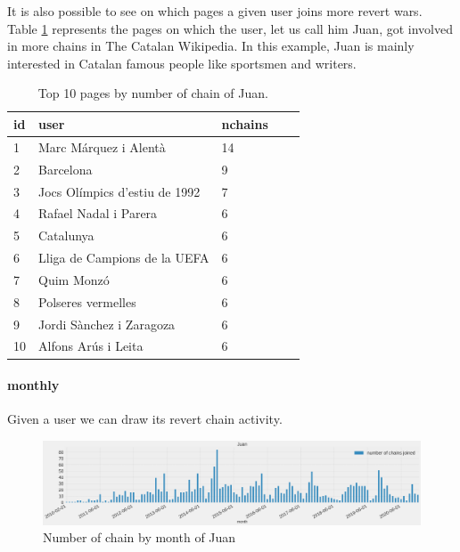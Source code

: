 It is also possible to see on which pages a given user joins more revert wars. Table
\ref{table:pagesuser}  represents the pages on which the user, let us call him Juan, got involved in more chains in The Catalan
Wikipedia. In this example, Juan is mainly interested in Catalan famous people
like sportsmen and writers.

\begin{table}[H]
    \centering
    \begin{tabularx}{\columnwidth}{@{}Xllll@{}}
        \midrule
        \textbf{id}& \textbf{user} & \textbf{nchains}  \\ \toprule
        1 & Marc Márquez i Alentà & 14  \\
        2 & Barcelona & 9   \\
        3 & Jocs Olímpics d'estiu de 1992 & 7   \\
        4 & Rafael Nadal i Parera & 6  \\
        5 & Catalunya &  6 \\
        6 & Lliga de Campions de la UEFA	 &  6 \\
        7 & Quim Monzó &  6 \\
        8 & Polseres vermelles &  6 \\
        9 & Jordi Sànchez i Zaragoza &  6 \\
        10 & Alfons Arús i Leita &  6\\

         \bottomrule
    \end{tabularx}
    
    \caption{Top 10 pages by number of chain of Juan. \label{table:pagesuser}}
\end{table}
\paragraph*{monthly}
Given a user we can draw its revert chain activity. 
\begin{figure}[H]
    \centering
    \includegraphics[width=\textwidth]{./chapters/04/assets/chains_user_month.png}
    \caption{Number of chain by month of Juan}
    \label{fig:chainsusermonth}
\end{figure}

